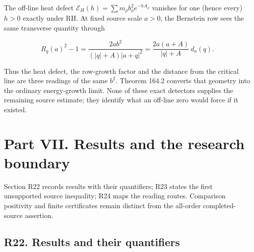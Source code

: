 \documentclass[
  11pt,
]{book}
\begin{document}
The off-line heat defect
\(\mathcal E_H(h)=\sum m_\rho b_\rho^2e^{-hA_\rho}\) vanishes for one
(hence every) \(h>0\) exactly under RH. At fixed source scale \(a>0\),
the Bernstein row sees the same transverse quantity through

\[
\boxed{R_q(a)^2-1
=\frac{2ab^2}{(|q|+A)|a+q|^2}
=\frac{2a(a+A)}{|q|+A}\,d_a(q).}
\tag{HG.4}
\]

Thus the heat defect, the row-growth factor and the distance from the
critical line are three readings of the same \(b^2\). Theorem 164.2
converts that geometry into the ordinary energy-growth limit. None of
these exact detectors supplies the remaining source estimate; they
identify what an off-line zero would force if it existed.

\chapter{Part VII. Results and the research
boundary}\label{part-vii.-results-and-the-research-boundary}

Section R22 records results with their quantifiers; R23 states the first
unsupported source inequality; R24 maps the reading routes. Comparison
positivity and finite certificates remain distinct from the all-order
completed-source assertion.

\section{R22. Results and their
quantifiers}\label{r22.-results-and-their-quantifiers}
\end{document}
